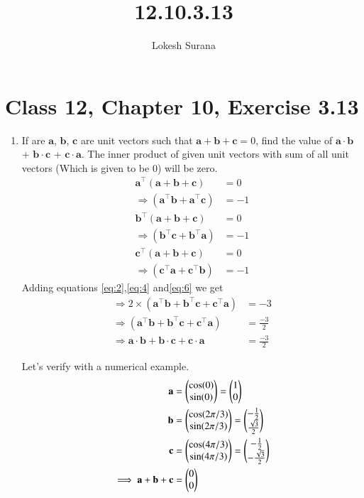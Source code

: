 \documentclass[journal,12pt,twocolumn]{IEEEtran}
\let\vec\mathbf
\begin{document}
\vspace{3cm}
\title{12.10.3.13}
\author{Lokesh Surana}
\maketitle
\section*{Class 12, Chapter 10, Exercise 3.13}
\begin{enumerate}[start=13]
\item  If are $\vec{a}$, $\vec{b}$, $\vec{c}$ are unit vectors such that $\vec{a} + \vec{b} + \vec{c} = {0}$, find the value of $\vec{a} \cdot \vec{b}$ + $\vec{b} \cdot \vec{c}$ + $\vec{c} \cdot \vec{a}$.
\break
\solution The inner product of given unit vectors with sum of all unit vectors (Which is given to be 0) will be zero.
\begin{align}
    \label{eq:1} \vec{a}^{\top}(\vec{a} + \vec{b} + \vec{c}) &= 0 \\
    \label{eq:2} \Rightarrow (\vec{a} ^{\top} \vec{b} + \vec{a} ^{\top} \vec{c}) &= -1\\
    \label{eq:3} \vec{b} ^{\top} (\vec{a} + \vec{b} + \vec{c}) &= 0 \\
    \label{eq:4} \Rightarrow (\vec{b} ^{\top} \vec{c} + \vec{b} ^{\top} \vec{a}) &= -1 \\
    \label{eq:5} \vec{c} ^{\top} (\vec{a} + \vec{b} + \vec{c}) &= 0 \\
    \label{eq:6} \Rightarrow (\vec{c} ^{\top} \vec{a} + \vec{c} ^{\top} \vec{b}) &= -1 
\end{align}
Adding equations \eqref{eq:2},\eqref{eq:4} and\eqref{eq:6} we get
\begin{align}
    \Rightarrow 2\times(\vec{a} ^{\top} \vec{b} + \vec{b} ^{\top} \vec{c} + \vec{c} ^{\top} \vec{a}) &= -3 \\
    \Rightarrow (\vec{a} ^{\top} \vec{b} + \vec{b} ^{\top} \vec{c} + \vec{c} ^{\top} \vec{a}) &= \frac{-3}{2} \\
    \Rightarrow \vec{a} \cdot \vec{b} + \vec{b} \cdot \vec{c} + \vec{c} \cdot \vec{a} &= \frac{-3}{2}
\end{align}

Let's verify with a numerical example.
\begin{align}
    \vec{a} &= \myvec{\cos(0)\\\sin(0)} = \myvec{1\\0} \\
    \vec{b} &= \myvec{\cos(2\pi/3)\\\sin(2\pi/3)} = \myvec{-\frac{1}{2}\\\frac{\sqrt{3}}{2}} \\
    \vec{c} &= \myvec{\cos(4\pi/3)\\\sin(4\pi/3)} = \myvec{-\frac{1}{2}\\-\frac{\sqrt{3}}{2}} \\
    \implies \vec{a} + \vec{b} + \vec{c} &= \myvec{0\\0} 
\end{align}


\end{enumerate}
\end{document}
